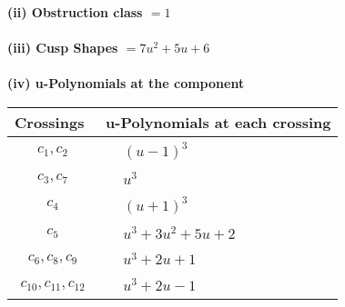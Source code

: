 \documentclass[1p]{elsarticle_modified}
\theoremstyle{definition}
\begin{document}
\flushleft \textbf{(ii) Obstruction class $= 1$}\\~\\
\flushleft \textbf{(iii) Cusp Shapes $= 7 u^2+5 u+6$}\\~\\
\newpage\renewcommand{\arraystretch}{1}
\flushleft \textbf{(iv) u-Polynomials at the component}\newline \\
\begin{tabular}{m{50pt}|m{274pt}}
Crossings & \hspace{64pt}u-Polynomials at each crossing \\
\hline $$\begin{aligned}c_{1},c_{2}\end{aligned}$$&$\begin{aligned}
&(u-1)^3
\end{aligned}$\\
\hline $$\begin{aligned}c_{3},c_{7}\end{aligned}$$&$\begin{aligned}
&u^3
\end{aligned}$\\
\hline $$\begin{aligned}c_{4}\end{aligned}$$&$\begin{aligned}
&(u+1)^3
\end{aligned}$\\
\hline $$\begin{aligned}c_{5}\end{aligned}$$&$\begin{aligned}
&u^3+3 u^2+5 u+2
\end{aligned}$\\
\hline $$\begin{aligned}c_{6},c_{8},c_{9}\end{aligned}$$&$\begin{aligned}
&u^3+2 u+1
\end{aligned}$\\
\hline $$\begin{aligned}c_{10},c_{11},c_{12}\end{aligned}$$&$\begin{aligned}
&u^3+2 u-1
\end{aligned}$\\
\hline
\end{tabular}\\~\\
\newpage\renewcommand{\arraystretch}{1}
\end{document}
